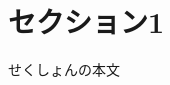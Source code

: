 \documentclass[10pt, a4j, uplatex, twocolumn]{jsarticle}
\begin{document}


\section{セクション1}
せくしょんの本文

\begin{spacing}{1.0}
    \lipsum[1]
\end{spacing}
\end{document}
